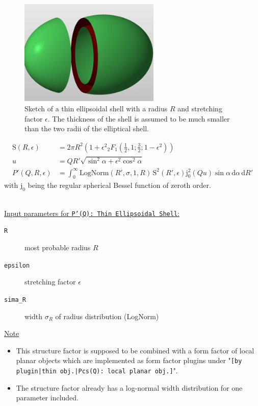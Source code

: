 \begin{figure}[htb]
\begin{center}
\includegraphics[width=0.596\textwidth,height=0.449\textwidth]{../images/form_factor/anisotropic/Ellipsoid_hollow.png}
\end{center}
\caption{Sketch of a thin ellipsoidal shell with a radius $R$ and stretching factor $\epsilon$. The thickness of the shell is assumed to be much smaller than the two radii of the elliptical shell.}
\label{fig:ThinEllipsoidalShell}
\end{figure}

\begin{align}
\mathrm{S}(R,\epsilon) &= 2\pi R^2\left(1+\epsilon^2 {}_2F_1\left(\frac12,1;\frac32;1-\epsilon^2\right)\right) \\
u &= QR'\sqrt{\sin^2\alpha+\epsilon^2\cos^2\alpha} \\
P'(Q,R,\epsilon) &=  \int_0^\infty \mathrm{LogNorm}(R',\sigma,1,R)\, \mathrm{S}^2(R',\epsilon) \mathrm{j}_0^2(Qu)\sin\alpha \, \mathrm{d}\alpha\,\mathrm{d}R'
\label{eq:PprimeEllSh}
\end{align}
with $\mathrm{j}_0$ being the regular spherical Bessel function of zeroth order.

\vspace{5mm}

\hspace{1pt}\\
\uline{Input parameters for \texttt{P'(Q): Thin Ellipsoidal Shell}:}
\begin{description}
    \item[\texttt{R}] most probable radius $R$
    \item[\texttt{epsilon}] stretching factor $\epsilon$
    \item[\texttt{sima\_R}] width $\sigma_R$ of radius distribution (LogNorm)
\end{description}

\noindent
\uline{Note}
\begin{itemize}
  \item This structure factor is supposed to be combined with a form factor of local planar objects which are implemented as form factor plugins
under "\texttt{[by plugin|thin obj.|Pcs(Q): local planar obj.]}".
\item The structure factor already has a log-normal width distribution for one parameter included.
\end{itemize}

